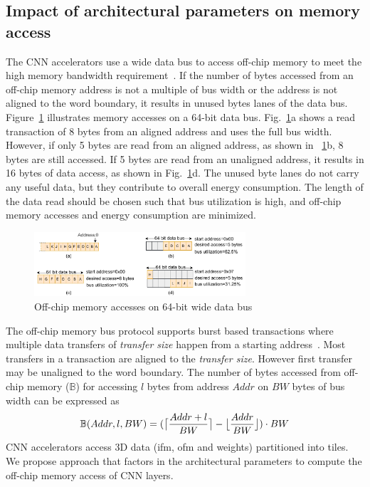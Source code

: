 \documentclass[a4paper,10pt]{article}
\DeclarePairedDelimiter{\ceil}{\lceil}{\rceil}
\DeclarePairedDelimiter\floor{\lfloor}{\rfloor}
\newcommand{\numBytesOffChip}{\mathbb{B}}
\newcommand{\busWidth}{BW}
\newcommand{\dataLength}{l}
\newcommand{\addressSym}{Addr}
\begin{document}
\subsection{Impact of architectural parameters on memory access}\label{sec:OffChipAccessModel}
The CNN accelerators use a wide data bus to access off-chip memory to meet the high memory bandwidth requirement~\cite{Chen2016EyerissAS,chen2014diannao}. If the number of bytes accessed from an off-chip memory address is not a multiple of bus width or the address is not aligned to the word boundary, it results in unused bytes lanes of the data bus. Figure~\ref{fig:AXI_AccesseOn64BitDataBus} illustrates memory accesses on a 64-bit data bus.  Fig.~\ref{fig:AXI_AccesseOn64BitDataBus}a shows a read transaction of 8 bytes from an aligned address and uses the full bus width. However, if only 5 bytes are read from an aligned address, as shown in \figurename~\ref{fig:AXI_AccesseOn64BitDataBus}b, 8 bytes are still accessed. If 5 bytes are read from an unaligned address, it results in 16 bytes of data access, as shown in Fig.~\ref{fig:AXI_AccesseOn64BitDataBus}d. The unused byte lanes do not carry any useful data, but they contribute to overall energy consumption. The length of the data read should be chosen such that bus utilization is high, and off-chip memory accesses and energy consumption are minimized.
\begin{figure}[!htb]
	\centering
	\includegraphics[width=0.7\textwidth]{./images/BurstTranscationOnAXI}
	\caption{Off-chip memory accesses on 64-bit wide data bus}
	\label{fig:AXI_AccesseOn64BitDataBus}
\end{figure}
The off-chip memory bus protocol supports burst based transactions where multiple data transfers of \emph{transfer size} happen from a starting address~\cite{AxiProtocolSpec}. Most transfers in a transaction are aligned to the \emph{transfer size}. However first transfer may be unaligned to the word boundary. 
The number of bytes accessed from off-chip memory ($\numBytesOffChip$) for accessing $\dataLength$ bytes from address $\addressSym$ on $\busWidth$ bytes of bus width can be expressed as
\begin{equation}\label{eq:accessfromUnalignedAddr}
	\begin{aligned}
		\numBytesOffChip(\addressSym,\dataLength,\busWidth)=(\ceil[\big]{\frac{\addressSym+\dataLength}{\busWidth}}-\floor[\big]{\frac{\addressSym}{\busWidth}})\cdot{\busWidth}
	\end{aligned}
\end{equation}
CNN accelerators access 3D data (ifm, ofm and weights) partitioned into tiles. We propose approach that factors in the architectural parameters to compute the off-chip memory access of CNN layers.
\end{document}
